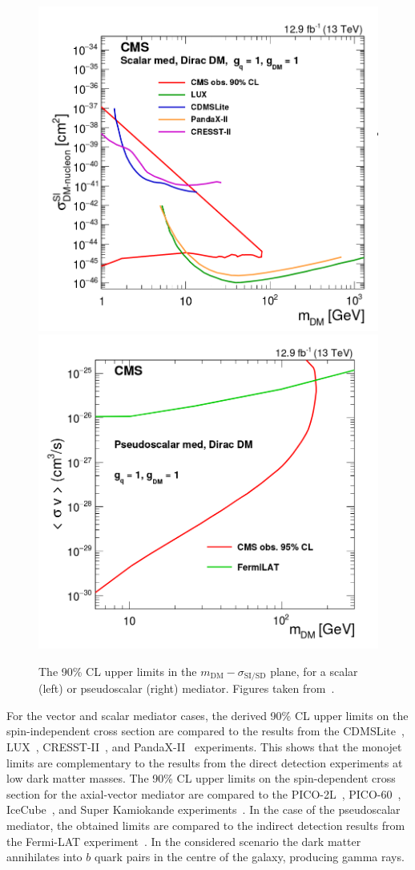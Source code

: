 \begin{figure}[ht]
  \centering
 \includegraphics[width=.49\textwidth]{scalar_DD.png} 
 \includegraphics[width=.49\textwidth]{pseudoscalar_DD.png} 
 \caption{The 90\% CL upper limits in the  $m_{\mathrm{DM}}-\sigma_{\mathrm{SI/SD}}$ plane, for a scalar (left) or pseudoscalar (right) mediator. Figures taken from~\cite{Sirunyan:2017hci}.}
 \label{fig:DDlimits_2}
\end{figure}

For the vector and scalar mediator cases, the derived 90\% CL upper limits on the spin-independent cross section are compared to the results from the CDMSLite~\cite{Agnese:2015nto}, LUX~\cite{Akerib:2015rjg}, CRESST-II~\cite{Angloher:2015ewa}, and PandaX-II~\cite{Tan:2016zwf} experiments. This shows that the monojet limits are complementary to the results from the direct detection experiments at low dark matter masses. The 90\% CL upper limits on the spin-dependent cross section for the axial-vector mediator are compared to the PICO-2L~\cite{Amole:2016pye}, PICO-60~\cite{Amole:2015pla}, IceCube~\cite{Aartsen:2016exj}, and Super Kamiokande experiments~\cite{Choi:2015ara}. In the case of the pseudoscalar mediator, the obtained limits are compared to the indirect detection results from the Fermi-LAT experiment~\cite{Ackermann:2011wa,Abdo:2010ex}. In the considered scenario the dark matter annihilates into $b$ quark pairs in the centre of the galaxy, producing gamma rays.

\clearpage{\pagestyle{empty}\cleardoublepage}
